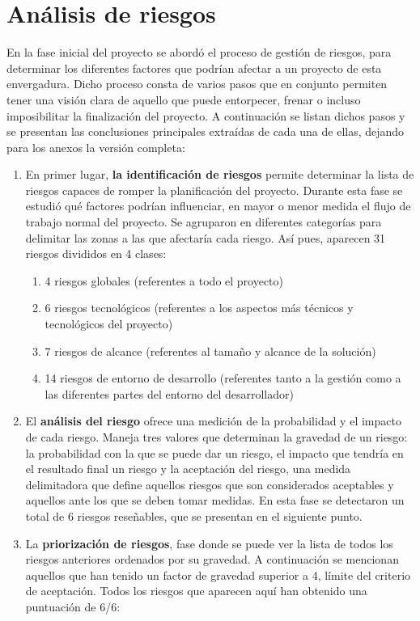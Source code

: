 \section{Análisis de riesgos}  \label{analisis.riesgos}
En la fase inicial del proyecto se abordó el proceso de gestión de riesgos, para determinar los diferentes factores que podrían afectar a un proyecto de esta envergadura. Dicho proceso consta de varios pasos que en conjunto permiten tener una visión clara de aquello que puede entorpecer, frenar o incluso imposibilitar la finalización del proyecto. A continuación se listan dichos pasos y se presentan las conclusiones principales extraídas de cada una de ellas, dejando para los anexos la versión completa: 
\begin{enumerate}
\item En primer lugar, \textbf{la identificación de riesgos} permite determinar la lista de riesgos capaces de romper la planificación del proyecto. Durante esta fase se estudió qué factores podrían influenciar, en mayor o menor medida el flujo de trabajo normal del proyecto. Se agruparon en diferentes categorías para delimitar las zonas a las que afectaría cada riesgo. Así pues, aparecen 31 riesgos divididos en 4 clases:
\begin{enumerate}
\item 4 riesgos globales (referentes a todo el proyecto)
\item 6 riesgos tecnológicos (referentes a los aspectos más técnicos y tecnológicos del proyecto)
\item 7 riesgos de alcance (referentes al tamaño y alcance de la solución)
\item 14 riesgos de entorno de desarrollo (referentes tanto a la gestión como a las diferentes partes del entorno del desarrollador)
\end{enumerate}
\item El \textbf{análisis del riesgo} ofrece una medición de la probabilidad y el impacto de cada riesgo. Maneja tres valores que determinan la gravedad de un riesgo: la probabilidad con la que se puede dar un riesgo, el impacto que tendría en el resultado final un riesgo y la aceptación del riesgo, una medida delimitadora que define aquellos riesgos que son considerados aceptables y aquellos ante los que se deben tomar medidas. En esta fase se detectaron un total de 6 riesgos reseñables, que se presentan en el siguiente punto.
\item La \textbf{priorización de riesgos}, fase donde se puede ver la lista de todos los riesgos anteriores ordenados por su gravedad. A continuación se mencionan aquellos que han tenido un factor de gravedad superior a 4, límite del criterio de aceptación. Todos los riesgos que aparecen aquí han obtenido una puntuación de 6/6: 

\end{enumerate}
